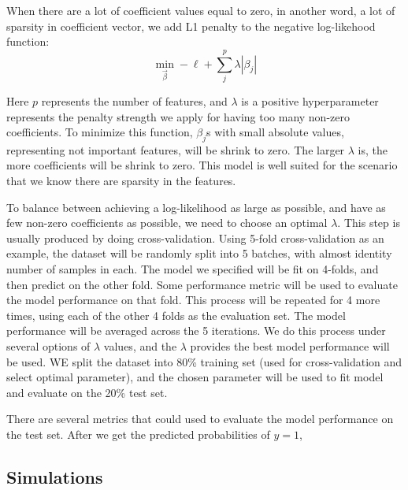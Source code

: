 \documentclass[12pt]{article}
\begin{document}
When there are a lot of coefficient values equal to zero, in another word, a lot of sparsity in coefficient vector, we add L1 penalty to the negative log-likehood function:
\[
  \min_{\vec{\beta}} - \ell + \sum_j^p \lambda | \beta_j |
\]

Here \( p \) represents the number of features, and \( \lambda \) is a positive hyperparameter represents the penalty strength we apply for having too many non-zero coefficients. To minimize this function, \( \beta_j \)s with small absolute values, representing not important features, will be shrink to zero. The larger \( \lambda \) is, the more coefficients will be shrink to zero. This model is well suited for the scenario that we know there are sparsity in the features.

To balance between achieving a log-likelihood as large as possible, and have as few non-zero coefficients as possible, we need to choose an optimal \( \lambda \). This step is usually produced by doing cross-validation. Using 5-fold cross-validation as an example, the dataset will be randomly split into 5 batches, with almost identity number of samples in each. The model we specified will be fit on 4-folds, and then predict on the other fold. Some performance metric will be used to evaluate the model performance on that fold. This process will be repeated for 4 more times, using each of the other 4 folds as the evaluation set. The model performance will be averaged across the 5 iterations. We do this process under several options of \( \lambda \) values, and the \( \lambda \) provides the best model performance will be used. WE split the dataset into 80\% training set (used for cross-validation and select optimal parameter), and the chosen parameter will be used to fit model and evaluate on the 20\% test set.

There are several metrics that could used to evaluate the model performance on the test set. After we get the predicted probabilities of \( y=1 \),



\subsection{Simulations}
\end{document}
